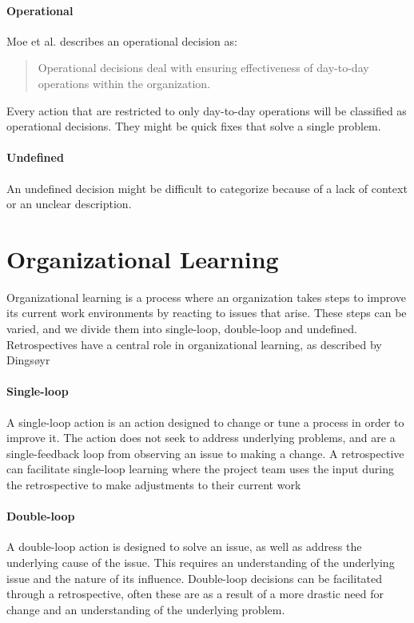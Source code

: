 \paragraph{Operational}
Moe et al. describes an operational decision as: 
\begin{quote}
Operational decisions deal with ensuring effectiveness of day-to-day operations within the organization. 
\end{quote}
Every action that are restricted to only day-to-day operations will be classified as operational decisions. They might be quick fixes that solve a single problem. 
\paragraph{Undefined}
An undefined decision might be difficult to categorize because of a lack of context or an unclear description.

\section{Organizational Learning}
Organizational learning is a process where an organization takes steps to improve its current work environments by reacting to issues that arise. These steps can be varied, and we divide them into single-loop, double-loop and undefined. Retrospectives have a central role in 	organizational learning, as described by Dingsøyr ~\cite{Dingsoyr2007}
\paragraph{Single-loop}
A single-loop action is an action designed to change or tune a process in order to improve it. The action does not seek to address underlying problems, and are a single-feedback loop from observing an issue to making a change. A retrospective can facilitate single-loop learning where the project team uses the input during the retrospective to make adjustments to their current work ~\cite{Dingsoyr2004}
\paragraph{Double-loop}
A double-loop action is designed to solve an issue, as well as address the underlying cause of the issue. This requires an understanding of the underlying issue and the nature of its influence. Double-loop decisions can be facilitated through a retrospective, often these are as a result of a more drastic need for change and an understanding of the underlying problem. ~\cite{Dingsoyr2004}
